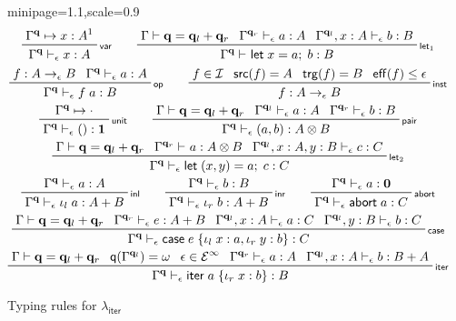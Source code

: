 \documentclass[acmsmall,screen,anonymous,review]{acmart}
\newcommand{\mc}[1]{\ensuremath{\mathcal{#1}}}
\newcommand{\mb}[1]{\ensuremath{\mathbf{#1}}}
\newcommand{\ms}[1]{\ensuremath{\mathsf{#1}}}
\newcommand{\lto}{:}
\newcommand{\linl}[1]{\iota_l\;{#1}}
\newcommand{\linr}[1]{\iota_r\;{#1}}
\newcommand{\labort}[1]{\ms{abort}\;{#1}}
\newcommand{\letexpr}[3]{\ensuremath{\ms{let}\;#1 = #2;\;#3}}
\newcommand{\caseexpr}[5]{\ms{case}\;#1\;\{\linl{#2} \lto #3, \linr{#4} \lto #5\}}
\newcommand{\liter}[3]{\ms{iter}\;#1\;\{ \linr{#2} \lto #3 \}}
\newcommand{\einf}[1]{#1 \in \mc{E}^\infty}
\newcommand{\qsp}[4]{#1 \vdash #2 = #3 + #4}
\newcommand{\cwk}[2]{#1 \mapsto #2}
\newcommand{\rle}[1]{{\scriptsize\textsf{#1}}}
\newcommand{\hasty}[4]{#1 \vdash_{#2} #3: {#4}}
\newcommand{\subiterexp}{\texorpdfstring{\(\lambda_{\ms{iter}}\)}{lambda-iter}}
\newcommand{\oneq}{1}
\newcommand{\topq}{\omega}
\newcommand{\alquant}{\ms{q}}
\begin{document}
\begin{figure}
  \begin{adjustbox}{minipage=1.1\textwidth,scale=0.9}
  \begin{gather*}
    \prftree[r]{\rle{var}}
      {\cwk{\Gamma^{\mb{q}}}{x : A^\oneq}}
        {\hasty{\Gamma^{\mb{q}}}{\epsilon}{x}{A}} 
      \qquad
    \prftree[r]{\rle{let$_1$}}{\qsp{\Gamma}{\mb{q}}{\mb{q}_l}{\mb{q}_r}}
      {\hasty{\Gamma^{\mb{q}_r}}{\epsilon}{a}{A}}
      {\hasty{\Gamma^{\mb{q}_l}, x : A}{\epsilon}{b}{B}}
      {\hasty{\Gamma^{\mb{q}}}{}{\letexpr{x}{a}{b}}{B}}
      \\
    \prftree[r]{\rle{op}}{f : A \to_\epsilon B}
      {\hasty{\Gamma^{\mb{q}}}{\epsilon}{a}{A}}
      {\hasty{\Gamma^{\mb{q}}}{\epsilon}{f\;a}{B}}
      \qquad
    \prftree[r]{\rle{inst}}
      {f \in \mc{I}}
      {\ms{src}(f) = A}
      {\ms{trg}(f) = B}
      {\ms{eff}(f) \leq \epsilon}
      {f : A \to_\epsilon B}
      \\
    \prftree[r]{\rle{unit}}
      {\cwk{\Gamma^{\mb{q}}}{\cdot}}{\hasty{\Gamma^{\mb{q}}}{\epsilon}{()}{\mb{1}}} 
      \qquad
    \prftree[r]{\rle{pair}}{\qsp{\Gamma}{\mb{q}}{\mb{q}_l}{\mb{q}_r}}
      {\hasty{\Gamma^{\mb{q}_l}}{\epsilon}{a}{A}}
      {\hasty{\Gamma^{\mb{q}_r}}{\epsilon}{b}{B}}
      {\hasty{\Gamma^{\mb{q}}}{\epsilon}{(a, b)}{A \otimes B}} \\
    \prftree[r]{\rle{let$_2$}}{\qsp{\Gamma}{\mb{q}}{\mb{q}_l}{\mb{q}_r}}
      {\hasty{\Gamma^{\mb{q}_r}}{}{a}{A \otimes B}}
      {\hasty{\Gamma^{\mb{q}_l}, x : A, y : B}{\epsilon}{c}{C}}
      {\hasty{\Gamma^{\mb{q}}}{\epsilon}{\letexpr{(x, y)}{a}{c}}{C}}
      \\
    \prftree[r]{\rle{inl}}
      {\hasty{\Gamma^{\mb{q}}}{\epsilon}{a}{A}}
      {\hasty{\Gamma^{\mb{q}}}{\epsilon}{\linl{a}}{A + B}} \qquad
    \prftree[r]{\rle{inr}}
      {\hasty{\Gamma^{\mb{q}}}{\epsilon}{b}{B}}
      {\hasty{\Gamma^{\mb{q}}}{\epsilon}{\linr{b}}{A + B}} \qquad    
    \prftree[r]{\rle{abort}}
      {\hasty{\Gamma^{\mb{q}}}{\epsilon}{a}{\mb{0}}}
      {\hasty{\Gamma^{\mb{q}}}{\epsilon}{\labort{a}}{C}}
      \\
    \prftree[r]{\rle{case}}{\qsp{\Gamma}{\mb{q}}{\mb{q}_l}{\mb{q}_r}}
      {\hasty{\Gamma^{\mb{q}_r}}{\epsilon}{e}{A + B}}
      {\hasty{\Gamma^{\mb{q}_l}, x : A}{\epsilon}{a}{C}}
      {\hasty{\Gamma^{\mb{q}_l}, y : B}{\epsilon}{b}{C}}
      {\hasty{\Gamma^{\mb{q}}}{\epsilon}{\caseexpr{e}{x}{a}{y}{b}}{C}} \\
    \prftree[r]{\rle{iter}}
      {\qsp{\Gamma}{\mb{q}}{\mb{q}_l}{\mb{q}_r}}
      {\alquant(\Gamma^{\mb{q}_l}) = \topq}
      {\einf{\epsilon}}
      {\hasty{\Gamma^{\mb{q}_r}}{\epsilon}{a}{A}}
      {\hasty{\Gamma^{\mb{q}_l}, x : A}{\epsilon}{b}{B + A}}
      {\hasty{\Gamma^{\mb{q}}}{\epsilon}{\liter{a}{x}{b}}{B}}
  \end{gather*}
  \end{adjustbox}
  \caption{Typing rules for \subiterexp{}}
  \Description{}
  \label{fig:expr-typing}
\end{figure}
\end{document}
